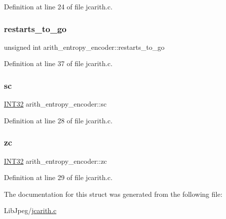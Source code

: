 Definition at line 24 of file jcarith.\+c.

\mbox{\label{structarith__entropy__encoder_add27b20b9b70a05f49c4242844253109}} 
\subsubsection{\texorpdfstring{restarts\_to\_go}{restarts\_to\_go}}
{\footnotesize\ttfamily unsigned int arith\+\_\+entropy\+\_\+encoder\+::restarts\+\_\+to\+\_\+go}



Definition at line 37 of file jcarith.\+c.

\mbox{\label{structarith__entropy__encoder_aabd22ab89a4d488c9eebb109d91c3655}} 
\subsubsection{\texorpdfstring{sc}{sc}}
{\footnotesize\ttfamily \mbox{\hyperlink{jmorecfg_8h_a0cb58e7e6f0bad369840a52e54a56ae0}{I\+N\+T32}} arith\+\_\+entropy\+\_\+encoder\+::sc}



Definition at line 28 of file jcarith.\+c.

\mbox{\label{structarith__entropy__encoder_ad02520a5282d4d042bf39e8a50d6ddf8}} 
\subsubsection{\texorpdfstring{zc}{zc}}
{\footnotesize\ttfamily \mbox{\hyperlink{jmorecfg_8h_a0cb58e7e6f0bad369840a52e54a56ae0}{I\+N\+T32}} arith\+\_\+entropy\+\_\+encoder\+::zc}



Definition at line 29 of file jcarith.\+c.



The documentation for this struct was generated from the following file\+:\begin{DoxyCompactItemize}
\item 
Lib\+Jpeg/\mbox{\hyperlink{jcarith_8c}{jcarith.\+c}}\end{DoxyCompactItemize}

